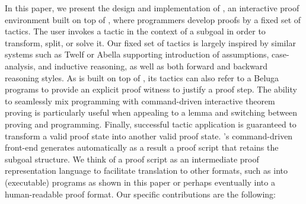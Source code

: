 



In this paper, we present the design and implementation of \Harpoon, an
interactive proof environment built on top of \Beluga, where programmers develop
proofs by a fixed set of tactics.
The user invokes a tactic in the context of a subgoal in order to transform,
split, or solve it.
Our fixed set of tactics is largely inspired by similar systems such as Twelf
\cite{Schurmann98cade} or Abella \cite{Gacek:IJCAR08} supporting introduction of
assumptions, case-analysis, and inductive reasoning, as well as both forward and
backward reasoning styles.
As \Harpoon{} is built on top of \Beluga{}, its tactics can also refer to a
Beluga{} programs to provide an explicit proof witness to justify a proof step.
The ability to seamlessly mix programming with command-driven interactive
theorem proving is particularly useful when appealing to a lemma and switching
between proving and programming.
Finally, successful tactic application is guaranteed to transform a valid proof
state into another valid proof state.
%
\Harpoon's command-driven front-end generates automatically as a result a proof
script that retains the subgoal structure. We think of a proof script as an
intermediate proof representation language to facilitate translation to
other formats, such as into (executable) \Beluga{} programs as shown in this paper or
perhaps eventually into a human-readable proof format.
Our specific contributions are the following:

